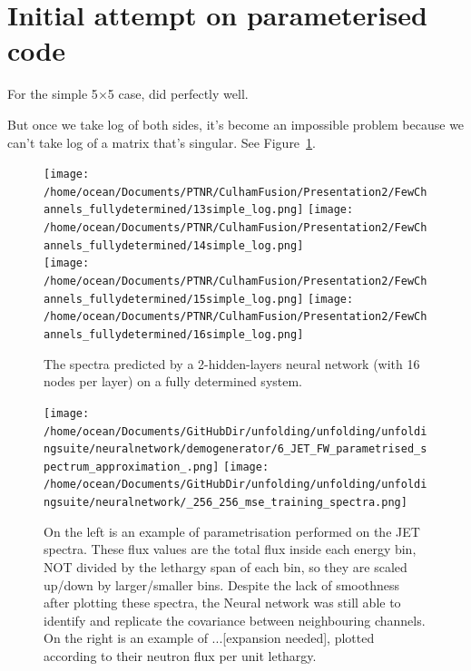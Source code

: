 \documentclass[a4paper, 12pt]{article}
\begin{document}
\section{Initial attempt on parameterised code}
For the simple 5$\times$5 case, did perfectly well.

But once we take log of both sides, it's become an impossible problem because we can't take log of a matrix that's singular. See Figure~\ref{5x5}.

\begin{figure}
\centering
\texttt{[image: /home/ocean/Documents/PTNR/CulhamFusion/Presentation2/FewChannels\_fullydetermined/13simple\_log.png]}
\texttt{[image: /home/ocean/Documents/PTNR/CulhamFusion/Presentation2/FewChannels\_fullydetermined/14simple\_log.png]}\\
\texttt{[image: /home/ocean/Documents/PTNR/CulhamFusion/Presentation2/FewChannels\_fullydetermined/15simple\_log.png]}
\texttt{[image: /home/ocean/Documents/PTNR/CulhamFusion/Presentation2/FewChannels\_fullydetermined/16simple\_log.png]}
\caption{The spectra predicted by a 2-hidden-layers neural network (with 16 nodes per layer) on a fully determined system.} \label{5x5}
\end{figure}


\begin{figure}
\centering
\texttt{[image: /home/ocean/Documents/GitHubDir/unfolding/unfolding/unfoldingsuite/neuralnetwork/demogenerator/6\_JET\_FW\_parametrised\_spectrum\_approximation\_.png]}
\texttt{[image: /home/ocean/Documents/GitHubDir/unfolding/unfolding/unfoldingsuite/neuralnetwork/\_256\_256\_mse\_training\_spectra.png]}
\caption{On the left is an example of parametrisation performed on the JET spectra. These flux values are the total flux inside each energy bin, NOT divided by the lethargy span of each bin, so they are scaled up/down by larger/smaller bins. Despite the lack of smoothness after plotting these spectra, the Neural network was still able to identify and replicate the covariance between neighbouring channels.\\
On the right is an example of ...[expansion needed], plotted according to their neutron flux per unit lethargy.}\label{Parametrisation}
\end{figure}
\end{document}
